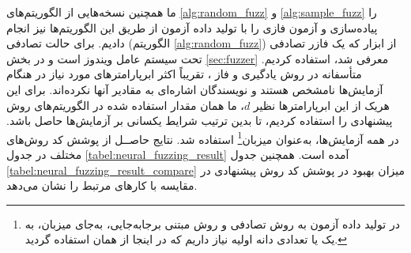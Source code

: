 ما همچنین نسخه‌هایی از الگوریتم‌های \ref{alg:random_fuzz} 
\cite{Sutton:2007:FBF:1324770}
و \ref{alg:sample_fuzz} 
\cite{Godefroid:2017:LML:3155562.3155573}
را پیاده‌سازی و آزمون فازی را با تولید داده آزمون از طریق این الگوریتم‌ها نیز انجام دادیم. برای حالت تصادفی (الگوریتم \ref{alg:random_fuzz}) از ابزار  که یک فازر تصادفی تحت سیستم عامل ویندوز است و در بخش \ref{sec:fuzzer} معرفی شد، استفاده کردیم. متأسفانه در روش یادگیری و فاز 
\cite{Godefroid:2017:LML:3155562.3155573}،
تقریباً اکثر ابرپارامترهای مورد نیاز در هنگام آزمایش‌ها نامشخص هستند و نویسندگان اشاره‌ای به مقادیر آنها نکرده‌اند. برای این هریک از این ابرپارامترها نظیر 
$d$،
ما همان مقدار استفاده شده در الگوریتم‌های روش ‌پیشنهادی را استفاده کردیم، تا بدین ترتیب شرایط یکسانی بر آزمایش‌ها حاصل باشد. در همه آزمایش‌ها،  به‌عنوان میزبان\footnote{در تولید داده آزمون به روش تصادفی و روش مبتنی برجابه‌جایی، به‌جای میزبان، به یک یا تعدادی دانه اولیه نیاز داریم که در اینجا از همان   استفاده گردید.}
 استفاده شد. نتایج حاصــل از پوشش کد روش‌های مختلف در جدول \ref{tabel:neural_fuzzing_result} آمده است. همچنین جدول \ref{tabel:neural_fuzzing_result_compare} میزان بهبود در پوشش کد روش پیشنهادی در مقایسه با کارهای مرتبط را نشان می‌دهد. 



